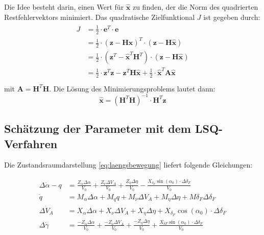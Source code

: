 Die Idee besteht darin, einen Wert für $\mathbf{\hat{x}}$ zu finden, der die 
Norm des quadrierten Restfehlervektors minimiert. Das 
quadratische Zielfunktional $J$ ist gegeben durch: 
\begin{align}
   \begin{split}
     J &= \frac{1}{2} \cdot \mathbf{e}^{T} \cdot \mathbf{e} \\
     &= \frac{1}{2} \cdot {(\mathbf{z}- \mathbf{H}\mathbf{\hat{x}})}^{T}\cdot(\mathbf{z}- \mathbf{H}\mathbf{\hat{x}}) \\
     &= \frac{1}{2} \cdot (\mathbf{z}^{T} -\mathbf{\hat{x}}^{T}\mathbf{H}^{T})\cdot(\mathbf{z}- \mathbf{H}\mathbf{\hat{x}}) \\
     &= \frac{1}{2} \cdot \mathbf{z}^{T}\mathbf{z} - \mathbf{z}^{T}\mathbf{H}\mathbf{\hat{x}} + \frac{1}{2}\cdot 
     {\mathbf{\hat{x}}}^{T}\mathbf{A}\mathbf{\hat{x}}  \\
   \end{split}
\end{align}
mit $\mathbf{A} = \mathbf{H}^{T} \mathbf{H}$. Die Lösung des Minimierungsproblems lautet dann:
\begin{equation}
    \hat{\mathbf{x}}= {(\mathbf{H}^{T} \mathbf{H})}^{-1} \cdot \mathbf{H}^{T} \mathbf{z} 
    \label{eq:minProblemLoesung}
\end{equation}


\subsection{Schätzung der Parameter mit dem LSQ-Verfahren} 

Die Zustandsraumdarstellung \eqref{eq:laengsbewegung} liefert folgende Gleichungen: 

\begin{align}
	\Delta\dot \alpha-q &=  \frac{Z_{\alpha}\Delta\alpha}{V_0} + \frac{Z_{\nu}\Delta V_{A}}{V_0} + 
	\frac{Z_{\eta}\Delta\eta}{V_0} - \frac{X_{\delta_F}\sin{(\alpha_0)}\cdot\Delta\delta_F}{V_0}\\
	\dot q &= M_{\alpha}\Delta\alpha + M_q q + M_{\nu}\Delta V_A + M_{\eta}\Delta\eta + M{\delta_F}\Delta\delta_F\\
	\Delta\dot V_A &= X_{\alpha}\Delta\alpha +  X_{\nu}\Delta V_A + X_{\eta}\Delta\eta + 
	X_{\delta_F}\cos{(\alpha_0)}\cdot\Delta\delta_F \\
	\Delta \dot \gamma &= \frac{- Z_{\alpha}\Delta\alpha}{V_0} + \frac{- Z_{\nu}\Delta V_{A}}{V_0} + 
	\frac{-Z_{\eta}\Delta\eta}{V_0} + \frac{X_{\delta F}\sin{(\alpha_0)}\cdot\Delta\delta_F}{V_0}
\end{align}
	
